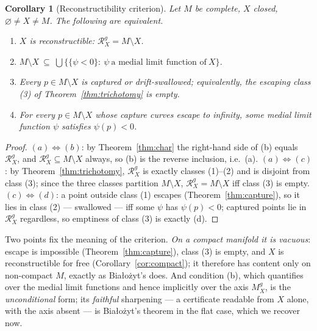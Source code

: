 \documentclass[11pt]{article}
\newtheorem{corollary}[theorem]{Corollary}
\theoremstyle{remark}
\newcommand{\X}{X}
\newcommand{\Mg}{M^{g}_{\X}}
\newcommand{\Rg}{\mathcal{R}^{g}_{\X}}
\begin{document}
\begin{corollary}[Reconstructibility criterion]
\label{cor:reconstructible}
Let $M$ be complete, $\X$ closed, $\varnothing\neq\X\neq M$. The
following are equivalent.
\begin{enumerate}[label=\textup{(\alph*)}]
\item $\X$ is reconstructible: $\Rg=M\setminus\X$.
\item $M\setminus\X\ \subseteq\ \bigcup\bigl\{\{\psi<0\}:\ \psi\
\text{a medial limit function of}\ \X\bigr\}$.
\item Every $p\in M\setminus\X$ is captured or drift-swallowed;
equivalently, the escaping class \textup{(3)} of
Theorem~\ref{thm:trichotomy} is empty.
\item For every $p\in M\setminus\X$ whose capture curves escape to
infinity, some medial limit function $\psi$ satisfies $\psi(p)<0$.
\end{enumerate}
\end{corollary}

\begin{proof}
$(a)\Leftrightarrow(b)$: by Theorem~\ref{thm:char} the right-hand side
of (b) equals $\Rg$, and $\Rg\subseteq M\setminus\X$ always, so (b) is
the reverse inclusion, i.e.\ (a). $(a)\Leftrightarrow(c)$: by
Theorem~\ref{thm:trichotomy}, $\Rg$ is exactly classes (1)--(2) and is
disjoint from class (3); since the three classes partition
$M\setminus\X$, $\Rg=M\setminus\X$ iff class (3) is empty.
$(c)\Leftrightarrow(d)$: a point outside class (1) escapes
(Theorem~\ref{thm:capture}), so it lies in class (2) --- swallowed ---
iff some $\psi$ has $\psi(p)<0$; captured points lie in $\Rg$
regardless, so emptiness of class (3) is exactly (d).
\end{proof}

Two points fix the meaning of the criterion. \emph{On a compact
manifold it is vacuous}: escape is impossible
(Theorem~\ref{thm:capture}), class (3) is empty, and $\X$ is
reconstructible for free (Corollary~\ref{cor:compact}); it therefore
has content only on non-compact $M$, exactly as Bia\l{}o\.zyt's does.
And condition (b), which quantifies over the medial limit functions
and hence implicitly over the axis $\Mg$, is the \emph{unconditional}
form; its \emph{faithful} sharpening --- a certificate readable from
$\X$ alone, with the axis absent --- is Bia\l{}o\.zyt's theorem in
the flat case, which we recover now.
\end{document}
